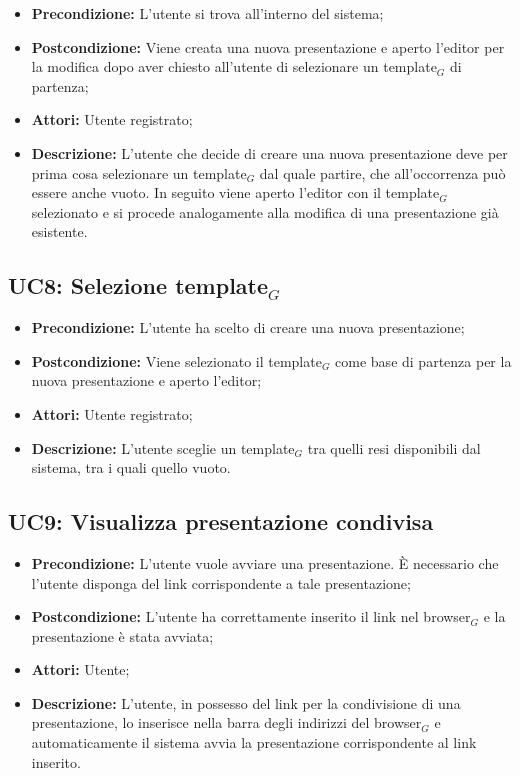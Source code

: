 \begin{itemize}
	\item \textbf{Precondizione:} L’utente si trova all’interno del sistema;
	\item \textbf{Postcondizione:} Viene creata una nuova presentazione e aperto l’editor per la modifica dopo aver chiesto all’utente di selezionare un template$_G$ di partenza;
	\item \textbf{Attori:} Utente registrato;
	\item \textbf{Descrizione:} L’utente che decide di creare una nuova presentazione deve per prima cosa selezionare un template$_G$ dal quale partire, che all’occorrenza può essere anche vuoto. In seguito viene aperto l’editor con il template$_G$ selezionato e si procede analogamente alla modifica di una presentazione già esistente.
\end{itemize}
\subsection{ UC8: Selezione template$_G$}

\begin{itemize}
	\item \textbf{Precondizione:} L’utente ha scelto di creare una nuova presentazione;
	\item \textbf{Postcondizione:} Viene selezionato il template$_G$ come base di partenza per la nuova presentazione e aperto l’editor;
	\item \textbf{Attori:} Utente registrato;
	\item \textbf{Descrizione:} L’utente sceglie un template$_G$ tra quelli resi disponibili dal sistema, tra i quali quello vuoto.
\end{itemize}
\subsection{ UC9: Visualizza presentazione condivisa}

\begin{itemize}
	\item \textbf{Precondizione:} L’utente vuole avviare una presentazione. È necessario che l’utente disponga del link corrispondente a tale presentazione;
	\item \textbf{Postcondizione:} L’utente ha correttamente inserito il link nel browser$_G$ e la presentazione è stata avviata;
	\item \textbf{Attori:} Utente;
	\item \textbf{Descrizione:} L’utente, in possesso del link per la condivisione di una presentazione, lo inserisce nella barra degli indirizzi del browser$_G$ e automaticamente il sistema avvia la presentazione corrispondente al link inserito.
\end{itemize}